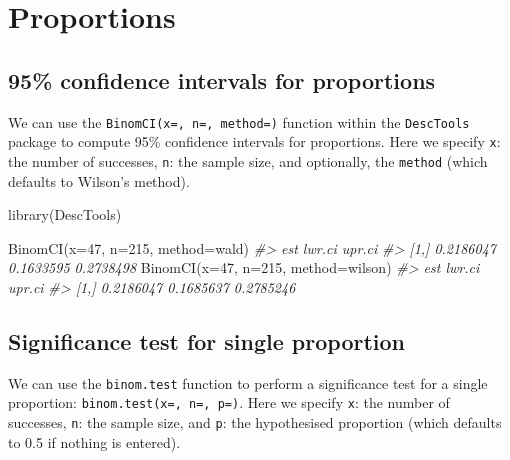\documentclass[
]{memoir}
\newenvironment{Shaded}{\begin{snugshade}}{\end{snugshade}}
\newcommand{\AttributeTok}[1]{\textcolor[rgb]{0.77,0.63,0.00}{#1}}
\newcommand{\CommentTok}[1]{\textcolor[rgb]{0.56,0.35,0.01}{\textit{#1}}}
\newcommand{\DecValTok}[1]{\textcolor[rgb]{0.00,0.00,0.81}{#1}}
\newcommand{\FunctionTok}[1]{\textcolor[rgb]{0.00,0.00,0.00}{#1}}
\newcommand{\NormalTok}[1]{#1}
\newcommand{\StringTok}[1]{\textcolor[rgb]{0.31,0.60,0.02}{#1}}
\begin{document}
\hypertarget{proportions}{%
\chapter{Proportions}\label{proportions}}

\hypertarget{confidence-intervals-for-proportions}{%
\section{95\% confidence intervals for proportions}\label{confidence-intervals-for-proportions}}

We can use the \texttt{BinomCI(x=,\ n=,\ method=)} function within the \texttt{DescTools} package to compute 95\% confidence intervals for proportions. Here we specify \texttt{x}: the number of successes, \texttt{n}: the sample size, and optionally, the \texttt{method} (which defaults to Wilson's method).

\begin{Shaded}
\begin{Highlighting}[]
\FunctionTok{library}\NormalTok{(DescTools)}

\FunctionTok{BinomCI}\NormalTok{(}\AttributeTok{x=}\DecValTok{47}\NormalTok{, }\AttributeTok{n=}\DecValTok{215}\NormalTok{, }\AttributeTok{method=}\StringTok{\textquotesingle{}wald\textquotesingle{}}\NormalTok{)}
\CommentTok{\#\textgreater{}            est    lwr.ci    upr.ci}
\CommentTok{\#\textgreater{} [1,] 0.2186047 0.1633595 0.2738498}
\FunctionTok{BinomCI}\NormalTok{(}\AttributeTok{x=}\DecValTok{47}\NormalTok{, }\AttributeTok{n=}\DecValTok{215}\NormalTok{, }\AttributeTok{method=}\StringTok{\textquotesingle{}wilson\textquotesingle{}}\NormalTok{)}
\CommentTok{\#\textgreater{}            est    lwr.ci    upr.ci}
\CommentTok{\#\textgreater{} [1,] 0.2186047 0.1685637 0.2785246}
\end{Highlighting}
\end{Shaded}

\hypertarget{significance-test-for-single-proportion}{%
\section{Significance test for single proportion}\label{significance-test-for-single-proportion}}

We can use the \texttt{binom.test} function to perform a significance test for a single proportion: \texttt{binom.test(x=,\ n=,\ p=)}. Here we specify \texttt{x}: the number of successes, \texttt{n}: the sample size, and \texttt{p}: the hypothesised proportion (which defaults to 0.5 if nothing is entered).
\end{document}

